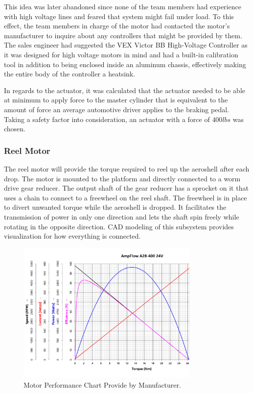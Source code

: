 This idea was later abandoned since none of the team members had experience with high voltage lines and feared that system might fail under load. To this effect, the team members in charge of the motor had contacted the motor's manufacturer to inquire about any controllers that might be provided by them. The sales engineer had suggested the VEX Victor BB High-Voltage Controller as it was designed for high voltage motors in mind and had a built-in calibration tool in addition to being enclosed inside an aluminum chassis, effectively making the entire body of the controller a heatsink.

In regards to the actuator, it was calculated that the actuator needed to be able at minimum to apply force to the master cylinder that is equivalent to the amount of force an average automotive driver applies to the braking pedal. Taking a safety factor into consideration, an actuator with a force of $400lbs$ was chosen.







\subsubsection{Reel Motor}

\indent\indent The reel motor will provide the torque required to reel up the aeroshell after each drop. The motor is mounted to the platform and directly connected to a worm drive gear reducer. The output shaft of the gear reducer has a sprocket on it that uses a chain to connect to a freewheel on the reel shaft. The freewheel is in place to divert unwanted torque while the aeroshell is dropped. It facilitates the transmission of power in only one direction and lets the shaft spin freely while rotating in the opposite direction. CAD modeling of this subsystem provides visualization for how everything is connected.

\begin{figure}[ht]
\centering
\includegraphics[width=0.8\textwidth]{Figures/A28-400_Chart.png}
\caption{\label{fig:A28-400_Chart.png} Motor Performance Chart Provide by Manufacturer.}
\end{figure}

